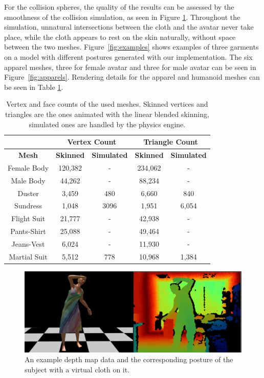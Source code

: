 \documentclass[number,preprint,review,12pt]{elsarticle}
\begin{document}
\doublespacing


For the collision spheres, the quality of the results can be assessed by the smoothness of the collision simulation, as seen in Figure \ref{fig:system}. Throughout the simulation, unnatural intersections between the cloth and the avatar never take place, while the cloth appears to rest on the skin naturally, without space between the two meshes. Figure~\ref{fig:examples} shows examples of three garments on a model with different postures generated with our implementation. The six apparel meshes, three for female avatar and three for male avatar can be seen in Figure~\ref{fig:apparels}. {\color{red}Rendering details for the apparel and humanoid meshes can be seen in Table \ref{tbl:mesh_details}.}


\begin{table}
\begin{center}
{\color{red}
\begin{tabular}{|c|c|c|c|c|}
\hline
 &  \multicolumn{2}{c|}{\textbf{Vertex Count}} &  \multicolumn{2}{c|}{\textbf{Triangle Count}} \\ \hline
 \textbf{Mesh}  & \textbf{Skinned} & \textbf{Simulated} & \textbf{Skinned} & \textbf{Simulated}  \\ \hline
 Female Body & 120,382 & - & 234,062 & - \\ \hline
 Male Body & 44,262 & - & 88,234 & - \\ \hline
 Duster & 3,459 & 480 & 6,660 & 840 \\ \hline
 Sundress & 1,048 & 3096 & 1,951 & 6,054 \\ \hline
 Flight Suit & 21,777 & - & 42,938 & - \\ \hline
 Pants-Shirt & 25,088 & - & 49,464 & - \\ \hline
 Jeans-Vest & 6,024 & - & 11,930 & - \\ \hline
 Martial Suit & 5,512 & 778 & 10,968 & 1,384 \\ \hline
\end{tabular}
}
\end{center}
{\color{red}\caption{Vertex and face counts of the used meshes. Skinned vertices and triangles are the ones animated with the linear blended skinning, simulated ones are handled by the physics engine.}}
\label{tbl:mesh_details}
\end{table} 

\begin{figure}[htbp]
	\begin{center} 
			\includegraphics[width=1.00\textwidth]{scshot.eps}
	\end{center}
	\caption{An example depth map data and the corresponding posture of the subject with a virtual cloth on it.}
	\label{fig:system}
\end{figure}
 
\end{document}
